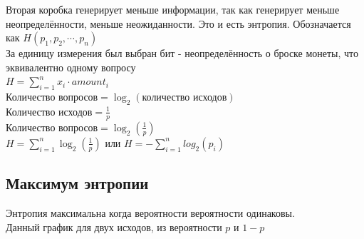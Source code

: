 \documentclass[12pt]{article}
\begin{document}
    Вторая коробка генерирует меньше информации, так как генерирует меньше неопределённости, меньше неожиданности.
    Это и есть энтропия. Обозначается как $H(p_1,p_2,\cdots ,p_n)$\\
    За единицу измерения был выбран бит - неопределённость о броске монеты, что эквивалентно одному вопросу\\
$H=\sum\limits_{i=1}^{n}x_i\cdot amount_i$\\
    Количество вопросов$=\log_2(\textbf{количество исходов})$\\
    Количество исходов$=\frac{1}{p}$\\
    Количество вопросов$=\log_2(\frac{1}{p})$\\
$H=\sum\limits_{i=1}^n \log_2(\frac{1}{p})$ или $H=-\sum\limits_{i=1}^n log_2(p_i)$


    \subsection{Максимум энтропии}
    Энтропия максимальна когда вероятности вероятности одинаковы.\\ Данный график для двух исходов, из вероятности $p$  и $1-p$
    \begin{center}
    \end{center}
\end{document}
